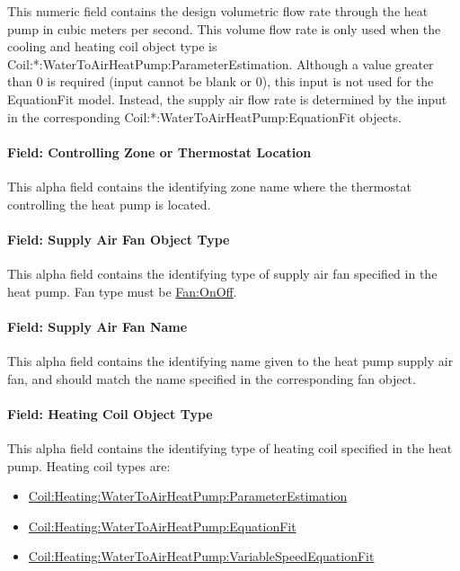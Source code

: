 This numeric field contains the design volumetric flow rate through the heat pump in cubic meters per second. This volume flow rate is only used when the cooling and heating coil object type is Coil:*:WaterToAirHeatPump:ParameterEstimation. Although a value greater than 0 is required (input cannot be blank or 0), this input is not used for the EquationFit model. Instead, the supply air flow rate is determined by the input in the corresponding Coil:*:WaterToAirHeatPump:EquationFit objects.

\paragraph{Field: Controlling Zone or Thermostat Location}\label{field-controlling-zone-or-thermostat-location-7}

This alpha field contains the identifying zone name where the thermostat controlling the heat pump is located.

\paragraph{Field: Supply Air Fan Object Type}\label{field-supply-air-fan-object-type-2}

This alpha field contains the identifying type of supply air fan specified in the heat pump. Fan type must be \hyperref[fanonoff]{Fan:OnOff}.

\paragraph{Field: Supply Air Fan Name}\label{field-supply-air-fan-name-2}

This alpha field contains the identifying name given to the heat pump supply air fan, and should match the name specified in the corresponding fan object.

\paragraph{Field: Heating Coil Object Type}\label{field-heating-coil-object-type-7}

This alpha field contains the identifying type of heating coil specified in the heat pump. Heating coil types are:

\begin{itemize}
\item
  \hyperref[coilheatingwatertoairheatpumpparameterestimation]{Coil:Heating:WaterToAirHeatPump:ParameterEstimation}
\item
  \hyperref[coilheatingwatertoairheatpumpequationfit]{Coil:Heating:WaterToAirHeatPump:EquationFit}
\item
  \hyperref[coilheatingwatertoairheatpumpvariablespeedequationfit]{Coil:Heating:WaterToAirHeat\hyperref[pumpvariablespeed]{Pump:VariableSpeed}EquationFit}
\end{itemize}

